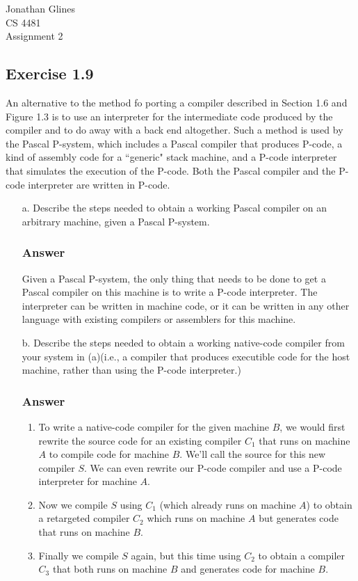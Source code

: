 \documentclass[12pt]{article}
\begin{document}
\begin{flushright}
{
\Large Jonathan Glines\\
\Large CS 4481\\
\Large Assignment 2\\
}
\end{flushright}
\subsection*{Exercise 1.9}
An alternative to the method fo porting a compiler described in Section 1.6 and Figure 1.3 is to use an interpreter for the intermediate code produced by the compiler and to do away with a back end altogether. Such a method is used by the Pascal P-system, which includes a Pascal compiler that produces P-code, a kind of assembly code for a ``generic" stack machine, and a P-code interpreter that simulates the execution of the P-code. Both the Pascal compiler and the P-code interpreter are written in P-code.
\begin{itemize}
\item[a.] Describe the steps needed to obtain a working Pascal compiler on an arbitrary machine, given a Pascal P-system.
\subsubsection*{Answer}
Given a Pascal P-system, the only thing that needs to be done to get a Pascal compiler on this machine is to write a P-code interpreter. The interpreter can be written in machine code, or it can be written in any other language with existing compilers or assemblers for this machine.

\item[b.] Describe the steps needed to obtain a working native-code compiler from your system in (a)(i.e., a compiler that produces executible code for the host machine, rather than using the P-code interpreter.)
\subsubsection*{Answer}
\begin{enumerate}
\item To write a native-code compiler for the given machine $B$, we would first rewrite the source code for an existing compiler $C_1$ that runs on machine $A$ to compile code for machine $B$. We'll call the source for this new compiler $S$. We can even rewrite our P-code compiler and use a P-code interpreter for machine $A$.
\item Now we compile $S$ using $C_1$ (which already runs on machine $A$) to obtain a retargeted compiler $C_2$ which runs on machine $A$ but generates code that runs on machine $B$.
\item Finally we compile $S$ again, but this time using $C_2$ to obtain a compiler $C_3$ that both runs on machine $B$ and generates code for machine $B$.
\end{enumerate}
\end{itemize}
\end{document}
